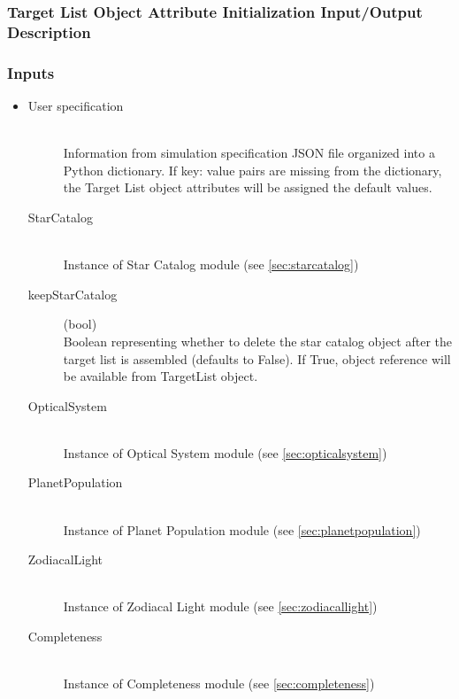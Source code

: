 \documentclass[cleanfoot]{asme2ej}
\begin{document}
\label{sec:targetlist}
\subsubsection{Target List Object Attribute Initialization Input/Output Description}
\subsubsection*{Inputs}
\begin{itemize}
    \item 
    \begin{description}
        \item[User specification] \hfill \\
        Information from simulation specification JSON file organized into a Python dictionary. If key: value pairs are missing from the dictionary, the Target List object attributes will be assigned the default values.
        \item[StarCatalog] \hfill \\
        Instance of Star Catalog module (see \ref{sec:starcatalog})
        \item[keepStarCatalog] (bool) \hfill \\
        Boolean representing whether to delete the star catalog object after the target list is assembled (defaults to False).  If True, object reference will be available from TargetList object.
        \item[OpticalSystem] \hfill \\
        Instance of Optical System module (see \ref{sec:opticalsystem})
        \item[PlanetPopulation] \hfill \\
        Instance of Planet Population module (see \ref{sec:planetpopulation})
        \item[ZodiacalLight] \hfill \\
        Instance of Zodiacal Light module (see \ref{sec:zodiacallight})
        \item[Completeness] \hfill \\
        Instance of Completeness module (see \ref{sec:completeness})
    \end{description}
\end{itemize}
\end{document}
